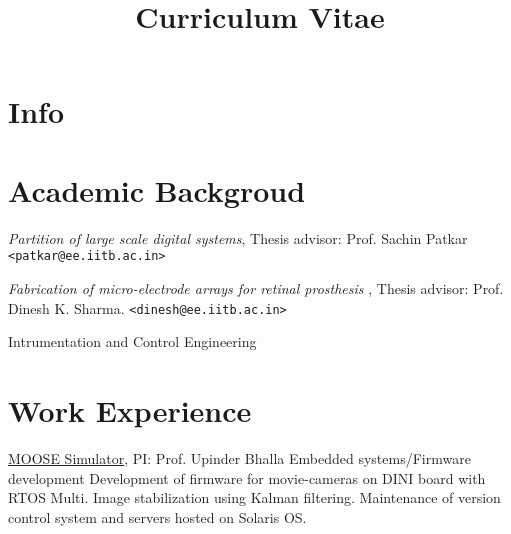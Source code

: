 \documentclass[11pt,a4paper, colorlinks=true, linkcolor=cyan]{moderncv}
\title{Curriculum Vitae}
\begin{document}
\maketitle

\vspace{0mm}

\section{Info}

\vspace{0mm}


\section{Academic Backgroud} 

{\emph{Partition of large scale digital systems}, Thesis advisor: Prof. Sachin
Patkar \texttt{<patkar@ee.iitb.ac.in>}
}

{\emph{Fabrication of micro-electrode arrays for retinal prosthesis}
, Thesis advisor: Prof. Dinesh K. Sharma. \texttt{<dinesh@ee.iitb.ac.in>}}

  {Intrumentation and Control Engineering }


\section{Work Experience}
{}{}{
    \href{https://github.com/BhallaLab/moose}{MOOSE Simulator}, PI: Prof. Upinder Bhalla
}
{}{}{Embedded systems/Firmware development
Development of firmware for movie-cameras on DINI board with RTOS Multi. Image
stabilization using Kalman filtering. Maintenance of version control system and
servers hosted on Solaris OS.}
\end{document}
